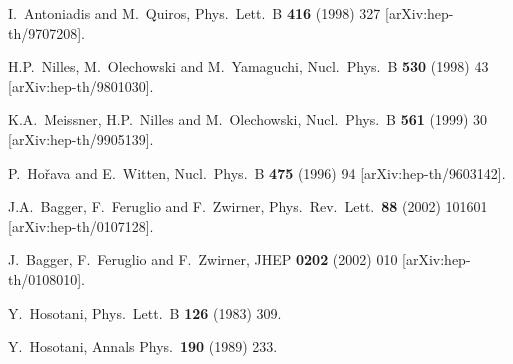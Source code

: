 \documentclass[a4paper,12pt]{article}
\begin{document}
\begin{thebibliography}{99}
I.~Antoniadis and M.~Quiros,
Phys.\ Lett.\ B {\bf 416} (1998) 327
[arXiv:hep-th/9707208].

H.P.~Nilles, M.~Olechowski and M.~Yamaguchi,
Nucl.\ Phys.\ B {\bf 530} (1998) 43
[arXiv:hep-th/9801030].

K.A.~Meissner, H.P.~Nilles and M.~Olechowski,
Nucl.\ Phys.\ B {\bf 561} (1999) 30
[arXiv:hep-th/9905139].

P.~Ho\v rava and E.~Witten,
Nucl.\ Phys.\ B {\bf 475} (1996) 94
[arXiv:hep-th/9603142].

J.A.~Bagger, F.~Feruglio and F.~Zwirner,
Phys.\ Rev.\ Lett.\  {\bf 88} (2002) 101601
[arXiv:hep-th/0107128].

J.~Bagger, F.~Feruglio and F.~Zwirner,
JHEP {\bf 0202} (2002) 010
[arXiv:hep-th/0108010].

Y.~Hosotani,
Phys.\ Lett.\ B {\bf 126} (1983) 309.

Y.~Hosotani,
Annals Phys.\  {\bf 190} (1989) 233.

\end{thebibliography}
\end{document}
